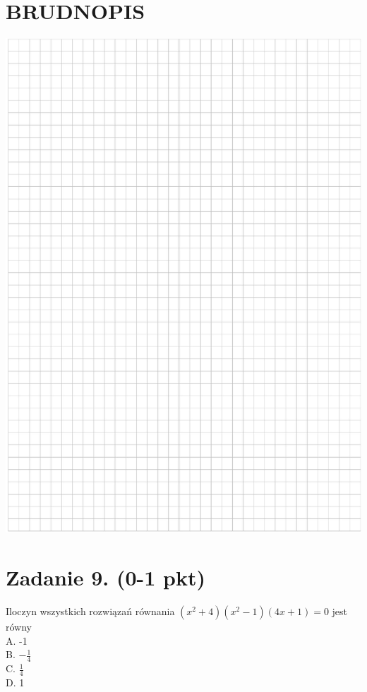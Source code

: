\documentclass[10pt]{article}
\begin{document}
\section*{BRUDNOPIS}
\begin{center}
\includegraphics[max width=\textwidth]{2024_11_21_b8ac5f500a5bbb1b4ec5g-05}
\end{center}

\section*{Zadanie 9. (0-1 pkt)}
Iloczyn wszystkich rozwiązań równania \(\left(x^{2}+4\right)\left(x^{2}-1\right)(4 x+1)=0\) jest równy\\
A. -1\\
B. \(-\frac{1}{4}\)\\
C. \(\frac{1}{4}\)\\
D. 1
\end{document}
